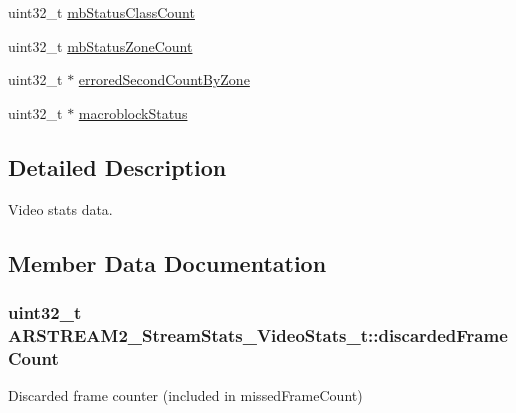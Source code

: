 \begin{DoxyCompactItemize}
\item 
uint32\+\_\+t \hyperlink{struct_a_r_s_t_r_e_a_m2___stream_stats___video_stats__t_a22f15447d86384b0203f720aa4abdffb}{mb\+Status\+Class\+Count}
\item 
uint32\+\_\+t \hyperlink{struct_a_r_s_t_r_e_a_m2___stream_stats___video_stats__t_a4ea60e129bc6b13d1d9feb71f17328f8}{mb\+Status\+Zone\+Count}
\item 
uint32\+\_\+t $\ast$ \hyperlink{struct_a_r_s_t_r_e_a_m2___stream_stats___video_stats__t_a6b29a1846d49e71a526250194f3a6679}{errored\+Second\+Count\+By\+Zone}
\item 
uint32\+\_\+t $\ast$ \hyperlink{struct_a_r_s_t_r_e_a_m2___stream_stats___video_stats__t_a75e0b6772316aee04b98df66e38dcfd7}{macroblock\+Status}
\end{DoxyCompactItemize}


\subsection{Detailed Description}
Video stats data. 

\subsection{Member Data Documentation}
\subsubsection[{\texorpdfstring{discarded\+Frame\+Count}{discardedFrameCount}}]{\setlength{\rightskip}{0pt plus 5cm}uint32\+\_\+t A\+R\+S\+T\+R\+E\+A\+M2\+\_\+\+Stream\+Stats\+\_\+\+Video\+Stats\+\_\+t\+::discarded\+Frame\+Count}\hypertarget{struct_a_r_s_t_r_e_a_m2___stream_stats___video_stats__t_a06a2fb8980eb2e74d1a38cc8251bd72e}{}\label{struct_a_r_s_t_r_e_a_m2___stream_stats___video_stats__t_a06a2fb8980eb2e74d1a38cc8251bd72e}
Discarded frame counter (included in missed\+Frame\+Count) 
